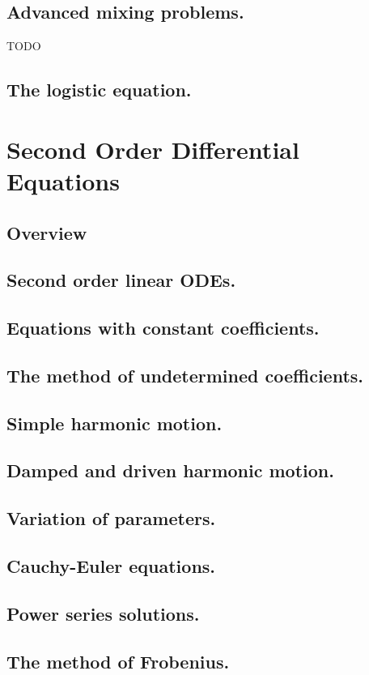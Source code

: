 \documentclass{article}
\begin{document}
\subsection{Advanced mixing problems.}
TODO
\subsection{The logistic equation.}

\pagebreak

\section{Second Order Differential Equations}
\subsection*{Overview}

\subsection{Second order linear ODEs.}
\subsection{Equations with constant coefficients.}
\subsection{The method of undetermined coefficients.}
\subsection{Simple harmonic motion.}
\subsection{Damped and driven harmonic motion.}
\subsection{Variation of parameters.}
\subsection{Cauchy-Euler equations.}
\subsection{Power series solutions.}
\subsection{The method of Frobenius.}
\end{document}
